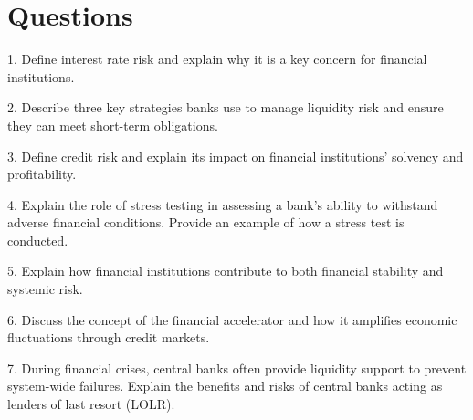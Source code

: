 \newpage

\section*{Questions}
1. Define interest rate risk and explain why it is a key concern for financial
institutions.

2. Describe three key strategies banks use to manage liquidity risk and ensure they
can meet short-term obligations.

3. Define credit risk and explain its impact on financial institutions’ solvency and
profitability.

4. Explain the role of stress testing in assessing a bank’s ability to withstand
adverse financial conditions. Provide an example of how a stress test is
conducted.

5. Explain how financial institutions contribute to both financial stability and
systemic risk.

6. Discuss the concept of the financial accelerator and how it amplifies economic
fluctuations through credit markets.

7. During financial crises, central banks often provide liquidity support to prevent
system-wide failures. Explain the benefits and risks of central banks acting as
lenders of last resort (LOLR).



